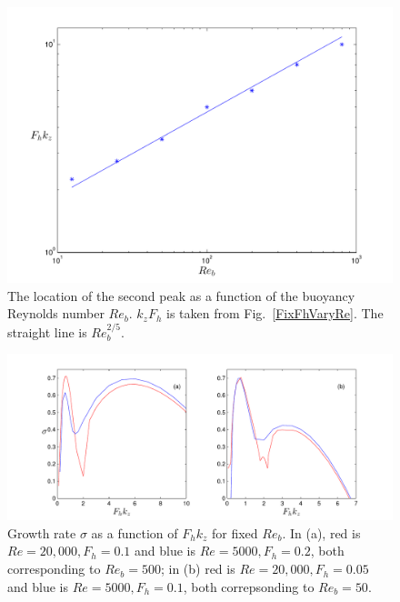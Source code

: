 
\begin{figure}
\begin{center}
\includegraphics[scale=0.65]{second_peak_buoyancy}
\caption{The location of the second peak as a function of the buoyancy Reynolds number $Re_{b}$. $k_{z}F_{h}$ is taken from Fig.~\ref{FixFhVaryRe}. The straight line is $Re_{b}^{2/5}$.}
\label{Buoy}
\end{center}
\end{figure}
\begin{figure}
\begin{center}
\includegraphics[scale=0.65]{buoyancy_reynolds}
\caption{Growth rate $\sigma$ as a function of $F_{h}k_{z}$ for fixed $Re_{b}$. In (a), red is $Re=20{,}000, F_{h}=0.1$ and blue is $Re=5000, F_{h}=0.2$, both corresponding to $Re_{b}=500$; in (b) red is $Re=20{,}000, F_{h}=0.05$ and blue is $Re=5000, F_{h}=0.1$, both correpsonding to $Re_{b}=50$.}
\label{ReBuoy}
\end{center}
\end{figure}


